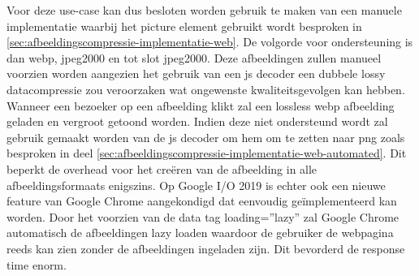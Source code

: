 Voor deze \gls{use-case} kan dus besloten worden gebruik te maken van een manuele implementatie waarbij het picture element gebruikt wordt besproken in \ref{sec:afbeeldingscompressie-implementatie-web}. De volgorde voor ondersteuning is dan \gls{webp}, \gls{jpeg2000} en tot slot \gls{jpeg2000}. Deze afbeeldingen zullen manueel voorzien worden aangezien het gebruik van een \gls{js} \gls{decoder} een dubbele \gls{lossy} \gls{datacompressie} zou veroorzaken wat ongewenste kwaliteitsgevolgen kan hebben. Wanneer een bezoeker op een afbeelding klikt zal een \gls{lossless} \gls{webp} afbeelding geladen en vergroot getoond worden. Indien deze niet ondersteund wordt zal gebruik gemaakt worden van de \gls{js} \gls{decoder} om hem om te zetten naar \gls{png} zoals besproken in deel \ref{sec:afbeeldingscompressie-implementatie-web-automated}. Dit beperkt de overhead voor het creëren van de afbeelding in alle \glspl{afbeeldingsformaat} enigszins. Op Google I/O 2019 is echter ook een nieuwe feature van Google Chrome aangekondigd dat eenvoudig geïmplementeerd kan worden. Door het voorzien van de data tag loading=''lazy'' zal Google Chrome automatisch de afbeeldingen lazy loaden waardoor de gebruiker de webpagina reeds kan zien zonder de afbeeldingen ingeladen zijn. Dit bevorderd de response time enorm.